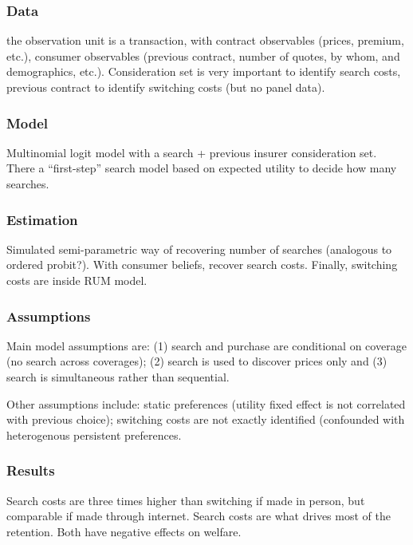 \subsubsection{Data}

the observation unit is a transaction, with contract observables (prices, premium, etc.), consumer observables (previous contract, number of quotes, by whom, and demographics, etc.). Consideration set is very important to identify search costs, previous contract to identify switching costs (but no panel data).

\subsubsection{Model}

Multinomial logit model with a search + previous insurer consideration set. There a ``first-step'' search model based on expected utility to decide how many searches.

\subsubsection{Estimation}

Simulated semi-parametric way of recovering number of searches (analogous to ordered probit?). With consumer beliefs, recover search costs. Finally, switching costs are inside RUM model.

\subsubsection{Assumptions}

Main model assumptions are: (1) search and purchase are conditional on coverage (no search across coverages); (2) search is used to discover prices only and (3) search is simultaneous rather than sequential.

Other assumptions include: static preferences (utility fixed effect is not correlated with previous choice); switching costs are not exactly identified (confounded with heterogenous persistent preferences.

\subsubsection{Results}

Search costs are three times higher than switching if made in person, but comparable if made through internet. Search costs are what drives most of the retention. Both have negative effects on welfare.

